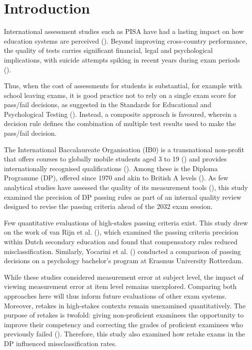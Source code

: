\documentclass[12pt]{article}
\begin{document}
\section{Introduction}

International assessment studies such as PISA have had a lasting impact on how education systems are perceived (\cite{waldowWhatPISADid2009}). Beyond improving cross-country performance, the quality of tests carries significant financial, legal and psychological implications, with suicide attempts spiking in recent years during exam periods (\cite{georgeExamSeasonStress2024}). 

Thus, when the cost of assessments for students is substantial, for example with school leaving exams, it is good practice not to rely on a single exam score for pass/fail decisions, as suggested in the Standards for Educational and Psychological Testing (\cite{americaneducationalresearchassociationStandardsEducationalPsychological2014}). Instead, a composite approach is favoured, wherein a decision rule defines the combination of multiple test results used to make the pass/fail decision.

The International Baccalaureate Organisation (IB0) is a transnational non-profit that offers courses to globally mobile students aged 3 to 19 (\cite{dohertyAppealInternationalBaccalaureate2009}) and provides internationally recognised qualifications (\cite{kingInternationalStudentMigration2013}). Among these is the Diploma Programme (DP), offered since 1970 and akin to British A levels (\cite{dohertyAppealInternationalBaccalaureate2009}). As few analytical studies have assessed the quality of its measurement tools (\cite{hillInternationalBaccalaureateIB2014}), this study examined the precision of DP passing rules as part of an internal quality review designed to revise the passing criteria ahead of the 2032 exam session. 

Few quantitative evaluations of high-stakes passing criteria exist. This study drew on the work of van Rijn et al. (\cite*{rijnEducationalMeasurementIssues2014}), which examined the passing criteria precision within Dutch secondary education and found that compensatory rules reduced misclassification. Similarly, Yocarini et al. (\cite*{yocariniSystematicComparisonDecision2018}) conducted a comparison of passing decisions on a psychology bachelor’s program at Erasmus University Rotterdam.

While these studies considered measurement error at subject level, the impact of viewing measurement error at item level remains unexplored. Comparing both approaches here will thus inform future evaluations of other exam systems. Moreover, retakes in high-stakes contexts remain unexamined quantitatively. The purpose of retakes is twofold: giving non-proficient examinees the opportunity to improve their competency and correcting the grades of proficient examinees who previously failed (\cite{coggeshallExaminationClassificationAccuracy2021}). Therefore, this study also examined how retake exams in the DP influenced missclassification rates.
\end{document}
